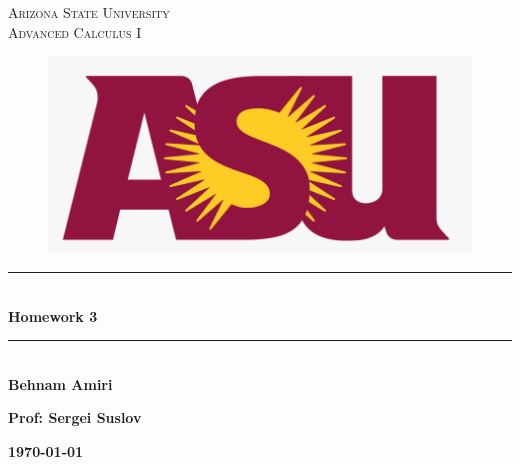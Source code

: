 \documentclass[fleqn]{article}
\begin{document}
  \begin{titlepage}

    \newcommand{\HRule}{\rule{\linewidth}{0.5mm}}

    \center


    \textsc{\LARGE Arizona State University}\\[1.5cm]

    \textsc{\LARGE Advanced Calculus I }\\[1.5cm]


    \begin{figure}
      \includegraphics[width=\linewidth]{asu.png}
    \end{figure}


    \HRule \\[0.4cm]
    { \huge \bfseries Homework 3 }\\[0.4cm] 
    \HRule \\[1.5cm]

    \textbf{Behnam Amiri}

    \bigbreak

    \textbf{Prof: Sergei Suslov}

    \bigbreak


    \textbf{{\large \today}\\[2cm]}

    \vfill

  \end{titlepage}
\end{document}
